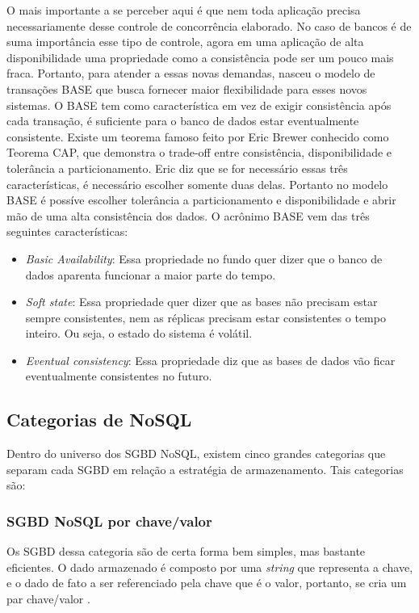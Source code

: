 	O mais importante a se perceber aqui é que nem toda aplicação precisa necessariamente desse controle de concorrência elaborado. No caso de bancos é de suma importância esse tipo de controle, agora em uma aplicação de alta disponibilidade uma propriedade como a consistência pode ser um pouco mais fraca. Portanto, para atender a essas novas demandas, nasceu o modelo de transações BASE\cite{Pritchett:2008:BAA:1394127.1394128} que busca fornecer maior flexibilidade para esses novos sistemas. O BASE tem como característica em vez de exigir consistência após cada transação, é suficiente para o banco de dados estar eventualmente consistente. Existe um teorema famoso feito por Eric Brewer conhecido como Teorema CAP\cite{Brewer:2010:CFT:1835698.1835701}, que demonstra o trade-off entre consistência, disponibilidade e tolerância a particionamento. Eric diz que se for necessário essas três características, é necessário escolher somente duas delas. Portanto no modelo BASE é possíve escolher tolerância a particionamento e disponibilidade e abrir mão de uma alta consistência dos dados. O acrônimo BASE vem das três seguintes características:
	\begin{itemize}
		\item \textit{Basic Availability}: Essa propriedade no fundo quer dizer que o banco de dados aparenta funcionar a maior parte do tempo.
		\item \textit{Soft state}: Essa propriedade quer dizer que as bases não precisam estar sempre consistentes, nem as réplicas precisam estar consistentes o tempo inteiro. Ou seja, o estado do sistema é volátil.
		\item \textit{Eventual consistency}: Essa propriedade diz que as bases de dados vão ficar eventualmente consistentes no futuro. 
	\end{itemize}
	
\subsection{Categorias de NoSQL}
	Dentro do universo dos SGBD NoSQL, existem cinco grandes categorias que separam cada SGBD em relação a estratégia de armazenamento\cite{nayak2013type}. Tais categorias são:
	
\subsubsection{SGBD NoSQL por chave/valor}
	Os SGBD dessa categoria são de certa forma bem simples, mas bastante eficientes. O dado armazenado é composto por uma \textit{string} que representa a chave, e o dado de fato a ser referenciado pela chave que é o valor, portanto, se cria um par chave/valor \cite{nayak2013type}\cite{kauremerging}.
	
